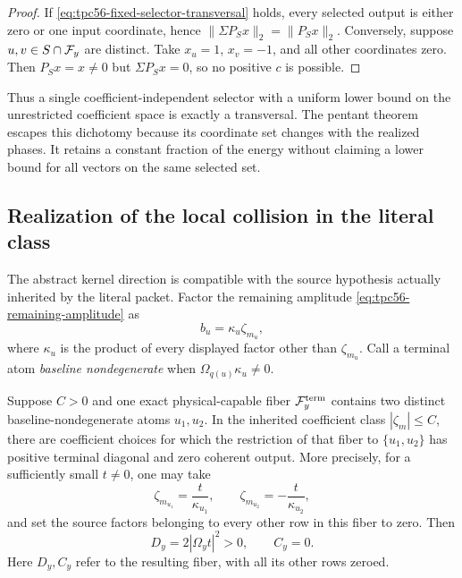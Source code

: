 \begin{proof}
If \eqref{eq:tpc56-fixed-selector-transversal} holds, every selected output
is either zero or one input coordinate, hence
\(\|\Sigma P_Sx\|_2=\|P_Sx\|_2\).  Conversely, suppose
\(u,v\in S\cap\mathcal F_y\) are distinct.  Take \(x_u=1\), \(x_v=-1\), and all
other coordinates zero.  Then \(P_Sx=x\ne0\) but \(\Sigma P_Sx=0\), so no
positive \(c\) is possible.
\end{proof}

Thus a single coefficient-independent selector with a uniform lower bound
on the unrestricted coefficient space is exactly a transversal.  The
pentant theorem escapes this dichotomy because its coordinate set changes
with the realized phases.  It retains a constant fraction of the energy
without claiming a lower bound for all vectors on the same selected set.

\subsection{Realization of the local collision in the literal class}

The abstract kernel direction is compatible with the source hypothesis
actually inherited by the literal packet.  Factor the remaining amplitude
\eqref{eq:tpc56-remaining-amplitude} as
\begin{equation}
 b_u=\kappa_u\zeta_{m_u},
 \label{eq:tpc56-baseline-times-zeta}
\end{equation}
where \(\kappa_u\) is the product of every displayed factor other than
\(\zeta_{m_u}\).  Call a terminal atom \emph{baseline nondegenerate} when
\(\Omega_{q(u)}\kappa_u\ne0\).

\begin{proposition}
\label{prop:tpc56-literal-two-atom-saturation}
Suppose \(C>0\) and one exact physical-capable fiber
\(\mathcal F_y^{\rm term}\) contains two
distinct baseline-nondegenerate atoms \(u_1,u_2\).  In the inherited
coefficient class \(|\zeta_m|\le C\), there are coefficient choices for
which the restriction of that fiber to \(\{u_1,u_2\}\) has positive
terminal diagonal and zero coherent output.  More precisely, for a
sufficiently small \(t\ne0\), one may take
\begin{equation}
 \zeta_{m_{u_1}}=\frac{t}{\kappa_{u_1}},
 \qquad
 \zeta_{m_{u_2}}=-\frac{t}{\kappa_{u_2}},
 \label{eq:tpc56-cancelling-zeta-choice}
\end{equation}
and set the source factors belonging to every other row in this fiber to
zero.  Then
\begin{equation}
 D_y=2|\Omega_y t|^2>0,
 \qquad
 C_y=0.
 \label{eq:tpc56-literal-local-cancellation}
\end{equation}
Here \(D_y,C_y\) refer to the resulting fiber, with all its other rows
zeroed.
\end{proposition}

